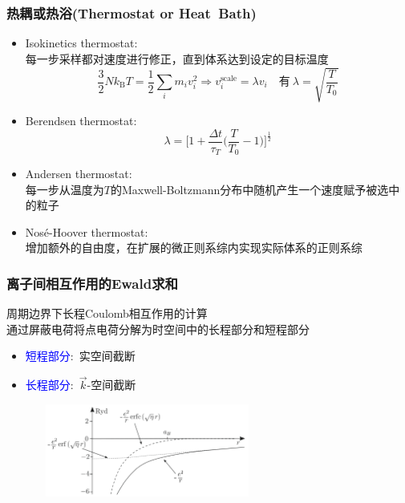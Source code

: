 \frame
{
	\frametitle{热耦或热浴\textrm{(Thermostat or Heat~Bath)}}
	\begin{itemize}
		\item \textrm{Isokinetics thermostat}:\\
			每一步采样都对速度进行修正，直到体系达到设定的目标温度
			\begin{displaymath}
				\dfrac32Nk_{\mathrm{B}}T=\dfrac12\sum_im_iv_i^2\Longrightarrow v_i^{\mathrm{scale}}=\lambda v_i\quad\mbox{有}~\lambda=\sqrt{\dfrac{T}{T_0}}
			\end{displaymath}
		\item \textrm{Berendsen thermostat}:
			\begin{displaymath}
				\lambda=\bigg[1+\dfrac{\Delta t}{\tau_T}\bigg(\dfrac{T}{T_0}-1\bigg)\bigg]^{\frac12}
			\end{displaymath}
		\item \textrm{Andersen thermostat}:\\
			每一步从温度为$T$的\textrm{Maxwell-Boltzmann}分布中随机产生一个速度赋予被选中的粒子
		\item \textrm{Nos\'e-Hoover thermostat}:\\
			增加额外的自由度，在扩展的微正则系综内实现实际体系的正则系综
	\end{itemize}
}

\frame
{
	\frametitle{离子间相互作用的\textrm{Ewald}求和}
	周期边界下长程\textrm{Coulomb}相互作用的计算\\
	通过屏蔽电荷将点电荷分解为时空间中的长程部分和短程部分
	\begin{itemize}
		\item \textcolor{blue}{短程部分}:~实空间截断
		\item \textcolor{blue}{长程部分}:~$\vec k$-空间截断
	\end{itemize}
\begin{figure}[h!]
\centering
\includegraphics[height=1.2in,width=2.82in,viewport=0 0 1100 455,clip]{Figures/Ewald_method.png}
\caption{\fontsize{5.5pt}{2.2pt}}%
\label{Error_Function}
\end{figure}
}

